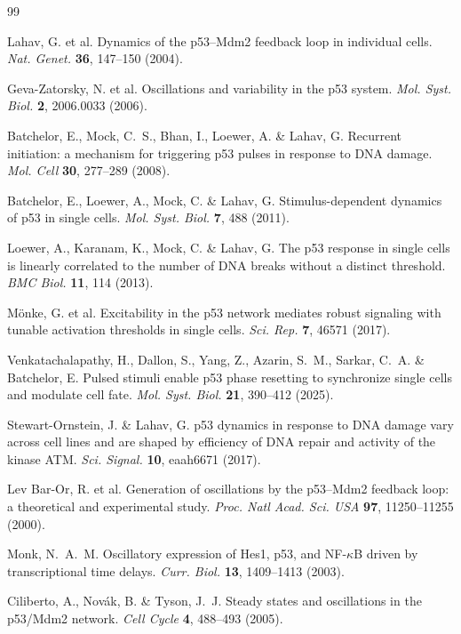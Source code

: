 \documentclass[11pt,a4paper]{article}
\begin{document}
\begin{thebibliography}{99}
\small

Lahav, G. et al. Dynamics of the p53--Mdm2 feedback loop in individual cells. \emph{Nat. Genet.} \textbf{36}, 147--150 (2004).

Geva-Zatorsky, N. et al. Oscillations and variability in the p53 system. \emph{Mol. Syst. Biol.} \textbf{2}, 2006.0033 (2006).

Batchelor, E., Mock, C.~S., Bhan, I., Loewer, A. \& Lahav, G. Recurrent initiation: a mechanism for triggering p53 pulses in response to DNA damage. \emph{Mol. Cell} \textbf{30}, 277--289 (2008).

Batchelor, E., Loewer, A., Mock, C. \& Lahav, G. Stimulus-dependent dynamics of p53 in single cells. \emph{Mol. Syst. Biol.} \textbf{7}, 488 (2011).

Loewer, A., Karanam, K., Mock, C. \& Lahav, G. The p53 response in single cells is linearly correlated to the number of DNA breaks without a distinct threshold. \emph{BMC Biol.} \textbf{11}, 114 (2013).

M\"onke, G. et al. Excitability in the p53 network mediates robust signaling with tunable activation thresholds in single cells. \emph{Sci. Rep.} \textbf{7}, 46571 (2017).

Venkatachalapathy, H., Dallon, S., Yang, Z., Azarin, S.~M., Sarkar, C.~A. \& Batchelor, E. Pulsed stimuli enable p53 phase resetting to synchronize single cells and modulate cell fate. \emph{Mol. Syst. Biol.} \textbf{21}, 390--412 (2025).

Stewart-Ornstein, J. \& Lahav, G. p53 dynamics in response to DNA damage vary across cell lines and are shaped by efficiency of DNA repair and activity of the kinase ATM. \emph{Sci. Signal.} \textbf{10}, eaah6671 (2017).

Lev Bar-Or, R. et al. Generation of oscillations by the p53--Mdm2 feedback loop: a theoretical and experimental study. \emph{Proc. Natl Acad. Sci. USA} \textbf{97}, 11250--11255 (2000).

Monk, N.~A.~M. Oscillatory expression of Hes1, p53, and NF-$\kappa$B driven by transcriptional time delays. \emph{Curr. Biol.} \textbf{13}, 1409--1413 (2003).

Ciliberto, A., Nov\'ak, B. \& Tyson, J.~J. Steady states and oscillations in the p53/Mdm2 network. \emph{Cell Cycle} \textbf{4}, 488--493 (2005).


\end{thebibliography}
\end{document}
